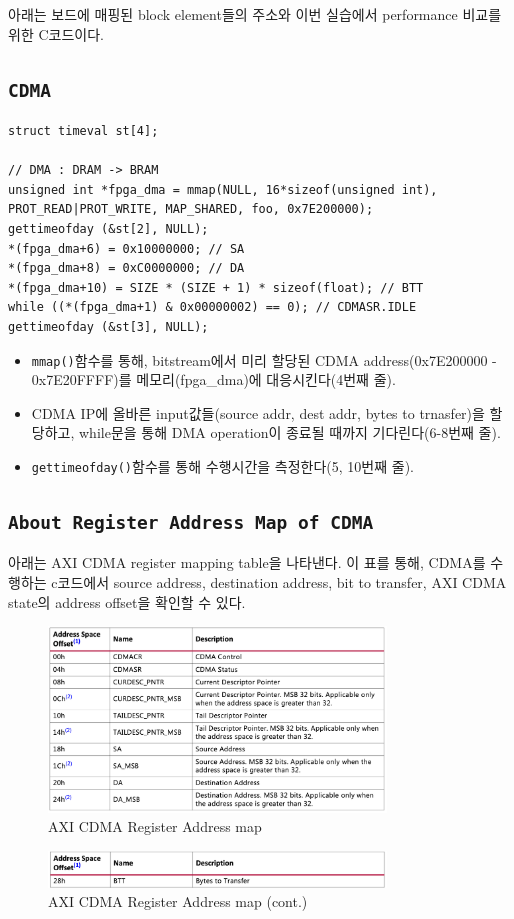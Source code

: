 \documentclass{article}
\begin{document}
아래는 보드에 매핑된 block element들의 주소와 이번 실습에서 performance 비교를 위한 C코드이다.
\subsection*{\texttt{CDMA}}
\begin{lstlisting}[style={c-style}]
struct timeval st[4];

// DMA : DRAM -> BRAM
unsigned int *fpga_dma = mmap(NULL, 16*sizeof(unsigned int), PROT_READ|PROT_WRITE, MAP_SHARED, foo, 0x7E200000);
gettimeofday (&st[2], NULL);
*(fpga_dma+6) = 0x10000000; // SA
*(fpga_dma+8) = 0xC0000000; // DA
*(fpga_dma+10) = SIZE * (SIZE + 1) * sizeof(float); // BTT
while ((*(fpga_dma+1) & 0x00000002) == 0); // CDMASR.IDLE
gettimeofday (&st[3], NULL);
\end{lstlisting}
\begin{itemize}
    \item  \texttt{mmap()}함수를 통해, bitstream에서 미리 할당된 CDMA address(0x7E200000 - 0x7E20FFFF)를 메모리(fpga\_dma)에 대응시킨다(4번째 줄).
    \item CDMA IP에 올바른 input값들(source addr, dest addr, bytes to trnasfer)을 할당하고, while문을 통해 DMA operation이 종료될 때까지 기다린다(6-8번째 줄).
    \item \texttt{gettimeofday()}함수를 통해 수행시간을 측정한다(5, 10번째 줄).
\end{itemize}

\subsection*{\texttt{About Register Address Map of CDMA}}
아래는 AXI CDMA register mapping table\cite{CDMA}을 나타낸다. 이 표를 통해, CDMA를 수행하는 c코드에서 source address, destination address, bit to transfer, AXI CDMA state의 address offset을 확인할 수 있다.
\begin{figure}[htb!]
	\centering
	\includegraphics[width=0.8\textwidth]{fig/cmda_addrmap_1.png}
\caption{AXI CDMA Register Address map}
\label{fig4}
\end{figure}
\begin{figure}[htb!]
	\centering
	\includegraphics[width=0.8\textwidth]{fig/cdma_addrmap_2.png}
\caption{AXI CDMA Register Address map (cont.)}
\label{fig5}
\end{figure}
\end{document}
